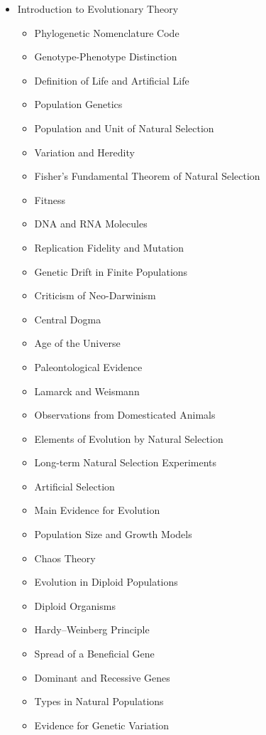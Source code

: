 \documentclass[12pt]{article}
\begin{document}
\begin{itemize}
    \item Introduction to Evolutionary Theory
    \begin{itemize}
        \item Phylogenetic Nomenclature Code
        \item Genotype-Phenotype Distinction
        \item Definition of Life and Artificial Life
        \item Population Genetics
        \item Population and Unit of Natural Selection
        \item Variation and Heredity
        \item Fisher’s Fundamental Theorem of Natural Selection
        \item Fitness
        \item DNA and RNA Molecules
        \item Replication Fidelity and Mutation
        \item Genetic Drift in Finite Populations
        \item Criticism of Neo-Darwinism
        \item Central Dogma
        \item Age of the Universe
        \item Paleontological Evidence
        \item Lamarck and Weismann
        \item Observations from Domesticated Animals
        \item Elements of Evolution by Natural Selection
        \item Long-term Natural Selection Experiments
        \item Artificial Selection
        \item Main Evidence for Evolution
        \item Population Size and Growth Models
        \item Chaos Theory
        \item Evolution in Diploid Populations
        \item Diploid Organisms
        \item Hardy–Weinberg Principle
        \item Spread of a Beneficial Gene
        \item Dominant and Recessive Genes
        \item Types in Natural Populations
        \item Evidence for Genetic Variation

\end{itemize}
\end{itemize}
\end{document}
